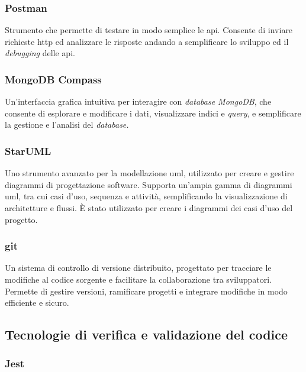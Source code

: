 \subsubsection{Postman}

Strumento che permette di testare in modo semplice le \gls{api}. 
Consente di inviare richieste \gls{http} ed analizzare le risposte andando a semplificare lo sviluppo ed il \textit{debugging} delle \gls{api}.

\subsubsection{MongoDB Compass}

Un'interfaccia grafica intuitiva per interagire con \textit{database MongoDB}, che consente di esplorare e modificare i dati, visualizzare indici e \textit{query},
e semplificare la gestione e l'analisi del \textit{database.}

\subsubsection{StarUML}

Uno strumento avanzato per la modellazione \gls{uml}, utilizzato per creare e gestire diagrammi di progettazione software. Supporta un'ampia gamma di diagrammi \gls{uml}, tra cui casi d'uso, sequenza e attività, semplificando la visualizzazione di architetture e flussi.
È stato utilizzato per creare i diagrammi dei casi d’uso del progetto.


\subsubsection{git}

Un sistema di controllo di versione distribuito, progettato per tracciare le modifiche al codice sorgente e facilitare la collaborazione tra sviluppatori. \\
Permette di gestire versioni, ramificare progetti e integrare modifiche in modo efficiente e sicuro. 

\pagebreak
\subsection{Tecnologie di verifica e validazione del codice}
\label{sez:tecnologie-validazione-codice}

\subsubsection{Jest}


